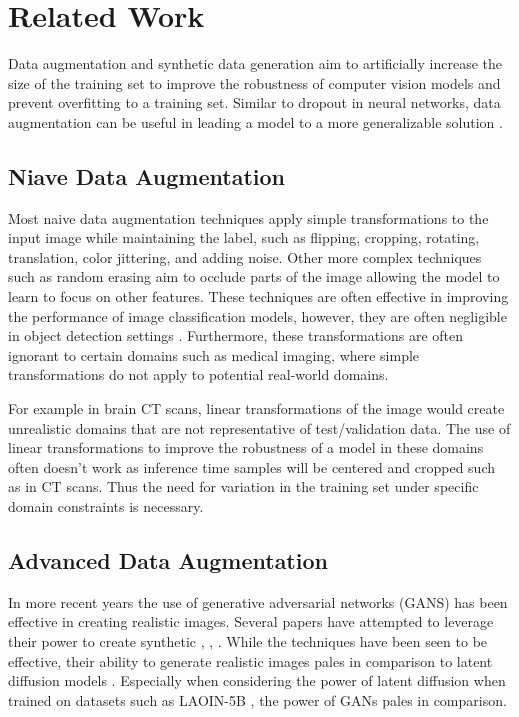 \documentclass{article}
\begin{document}
\section{Related Work}

Data augmentation and synthetic data generation aim to artificially increase the size of the training set to improve the robustness
of computer vision models and prevent overfitting to a training set. Similar to dropout in neural networks, data augmentation can be
useful in leading a model to a more generalizable solution \cite{1708.04896}.

\subsection{Niave Data Augmentation}

Most naive data augmentation techniques apply simple transformations to the input image while maintaining the label, such as flipping,
cropping, rotating, translation, color jittering, and adding noise. Other more complex techniques such as random erasing \cite{1708.04896} aim to occlude
parts of the image allowing the model to learn to focus on other features. These techniques are often effective in improving the performance
of image classification models, however, they are often negligible in object detection settings \cite{2204.08610}. Furthermore, these transformations 
are often ignorant to certain domains such as medical imaging, where simple transformations do not apply to potential real-world domains.

For example in brain CT scans, linear transformations of the image would create unrealistic domains that are not representative of test/validation data. 
The use of linear transformations to improve the robustness of a model in these domains often doesn't work as inference time samples will be centered 
and cropped such as in CT scans. Thus the need for variation in the training set under specific domain constraints is necessary. 

\subsection{Advanced Data Augmentation}

In more recent years the use of generative adversarial networks (GANS) \cite{1406.2661} has been effective in creating realistic images. Several papers
have attempted to leverage their power to create synthetic \cite{1911.02888}, \cite{2104.06490}, \cite{2106.05258}. While the techniques have been seen to be effective,
their ability to generate realistic images pales in comparison to latent diffusion models \cite{2112.10752}. Especially when considering the power of latent 
diffusion when trained on datasets such as LAOIN-5B \cite{2210.08402}, the power of GANs pales in comparison.
\end{document}

